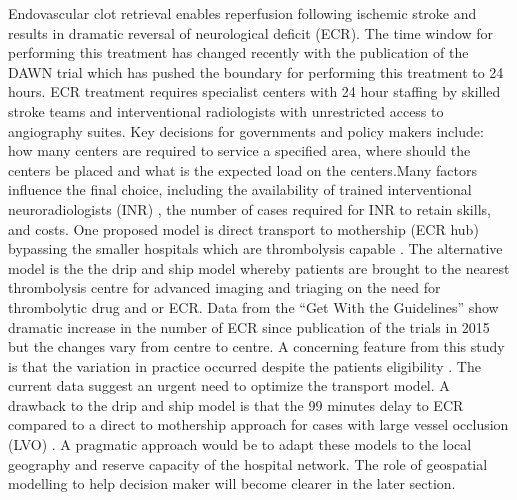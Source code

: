 \documentclass[utf8]{frontiersHLTH}
\begin{document}
Endovascular clot retrieval enables reperfusion following ischemic
stroke and results in dramatic reversal of neurological deficit
(ECR)\cite{berkhemer2015randomized,goyal2016endovascular,goyal2015randomized,campbell2015endovascular,saver2015stent}. The
time window for performing this treatment has changed recently with
the publication of the DAWN trial which has pushed the boundary for
performing this treatment to 24
hours\cite{nogueira2018thrombectomy}. ECR treatment requires
specialist centers with 24 hour staffing by skilled stroke teams and
interventional radiologists with unrestricted access to angiography
suites. Key decisions for governments and policy makers include: how
many centers are required to service a specified area, where should
the centers be placed and what is the expected load on the
centers\cite{Phan_2017}.Many factors influence the final choice,
including the availability of trained interventional neuroradiologists
(INR) , the number of cases required for INR to retain skills, and
costs. One proposed model is direct transport to mothership (ECR hub)
bypassing the smaller hospitals which are thrombolysis capable
\cite{Milne_2017, 10.1001/jamaneurol.2018.2424}. The
alternative model is the the drip and ship model whereby patients are
brought to the nearest thrombolysis centre for advanced imaging and
triaging on the need for thrombolytic drug and or ECR. Data from the
``Get With the Guidelines'' show dramatic increase in the number of
ECR since publication of the trials in 2015 but the changes vary from
centre to centre. A concerning feature from this study is that the
variation in practice occurred despite the patients eligibility
\cite{smith2017increase}.  The current data suggest an urgent need to
optimize the transport model. A drawback to the drip and ship model is
that the 99 minutes delay to ECR compared to a direct to mothership
approach for cases with large vessel occlusion (LVO)
\cite{froehler2017interhospital}. A pragmatic approach would be to
adapt these models to the local geography and reserve capacity of the
hospital network. The role of geospatial modelling to help decision maker will become clearer in the later section.
\end{document}
